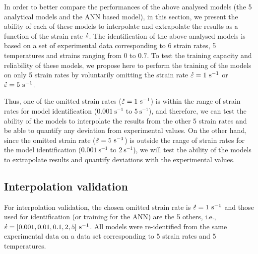 \documentclass[metals,article,submit,pdftex,moreauthors]{Definitions/mdpi}
\makeatletter
\DeclareRobustCommand{\mdot}[1]{\accentset{\mbox{\bfseries .}}{#1}}
\DeclareRobustCommand{\ie}{i.e.\@\xspace}
\DeclareRobustCommand{\ps}{\text{s}^{-1}}
\makeatother
\begin{document}
In order to better compare the performances of the above analysed models (the 5 analytical models and the ANN based model), in this section, we present the ability of each of these models to interpolate and extrapolate the results as a function of the strain rate $\mdot\varepsilon$.
The identification of the above analysed models is based on a set of experimental data corresponding to 6 strain rates, 5 temperatures and strains ranging from $0$ to $0.7$.
To test the training capacity and reliability of these models, we propose here to perform the training of the models on only 5 strain rates by voluntarily omitting the strain rate $\mdot\varepsilon=1~\ps$ or $\mdot\varepsilon=5~\ps$.

Thus, one of the omitted strain rates ($\mdot\varepsilon=1~\ps$) is within the range of strain rates for model identification ($0.001~\ps\text{ to }5~\ps$), and therefore, we can test the ability of the models to interpolate the results from the other 5 strain rates and be able to quantify any deviation from experimental values.
On the other hand, since the omitted strain rate ($\mdot\varepsilon=5~\ps$) is outside the range of strain rates for the model identification ($0.001~\ps\text{ to }2~\ps$), we will test the ability of the models to extrapolate results and quantify deviations with the experimental values.

\subsection{Interpolation validation}

For interpolation validation, the chosen omitted strain rate is $\mdot\varepsilon=1~\ps$ and those used for identification (or training for the ANN) are the 5 others, \ie, $\mdot\varepsilon=[0.001, 0.01, 0.1, 2, 5]~\ps$.
All models were re-identified from the same experimental data on a data set corresponding to 5 strain rates and 5 temperatures.
\end{document}
